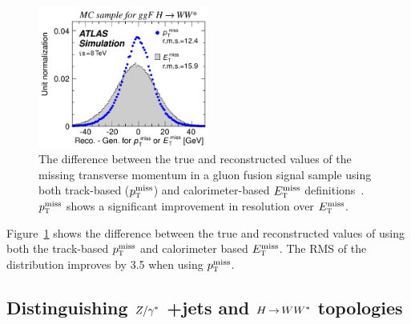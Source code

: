 %
\begin{figure}[h!]
  \centering
  \captionsetup{justification=centering}

  \includegraphics[width=0.5\textwidth]{figures/METResolution2}
  \caption{The difference between the true and reconstructed values of the missing transverse momentum in a gluon fusion signal sample using both track-based ($p_{\textrm{\footnotesize\sc t}}^{\rm miss}$) and calorimeter-based $E_{\textrm{\footnotesize\sc t}}^{\rm miss}$ definitions~\cite{WW2015}. $p_{\textrm{\footnotesize\sc t}}^{\rm miss}$ shows a significant improvement in resolution over $E_{\textrm{\footnotesize\sc t}}^{\rm miss}$.}
  \label{fig:METResolution2}
\end{figure}
%
Figure~\ref{fig:METResolution2} shows the difference between the true and reconstructed values of \met using both the track-based $p_{\textrm{\footnotesize\sc t}}^{\rm miss}$ and calorimeter based $E_{\textrm{\footnotesize\sc t}}^{\rm miss}$. The RMS of the distribution improves by 3.5 \GeV when using $p_{\textrm{\footnotesize\sc t}}^{\rm miss}$.

\subsection{Distinguishing $Z/\gamma^{\ast}$ +jets and $H{\,{\rightarrow}\,}WW^\ast$ topologies}

